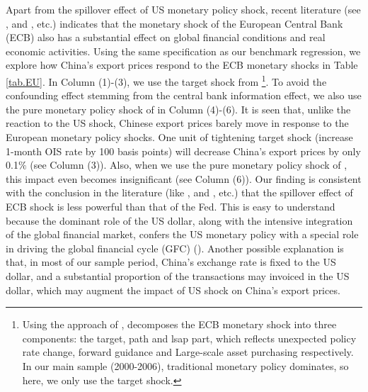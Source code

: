 Apart from the spillover effect of US monetary policy shock, recent literature (see \cite{ca2020monetary}, \cite{corsetti2021exchange} and \cite{miranda2022tale}, etc.) indicates that the monetary shock of the European Central Bank (ECB) also has a substantial effect on global financial conditions and real economic activities. Using the same specification as our benchmark regression, we explore how China's export prices respond to the ECB monetary shocks in Table \ref{tab.EU}. In Column (1)-(3), we use the target shock from \cite{miranda2022tale} \footnote{Using the approach of \cite{swanson2021measuring}, \cite{miranda2022tale} decomposes the ECB monetary shock into three components: the target, path and lsap part, which reflects unexpected policy rate change, forward guidance and Large-scale asset purchasing respectively. In our main sample (2000-2006), traditional monetary policy dominates, so here, we only use the target shock.}. To avoid the confounding effect stemming from the central bank information effect, we also use the pure monetary policy shock of \cite{jarocinski2020deconstructing} in Column (4)-(6). It is seen that, unlike the reaction to the US shock, Chinese export prices barely move in response to the European monetary policy shocks. One unit of tightening target shock (increase 1-month OIS rate by 100 basis points) will decrease China's export prices by only 0.1$\%$ (see Column (3)). Also, when we use the pure monetary policy shock of \cite{jarocinski2020deconstructing}, this impact even becomes insignificant (see Column (6)). Our finding is consistent with the conclusion in the literature (like \cite{ca2020monetary}, \cite{corsetti2021exchange} and \cite{miranda2022tale}, etc.) that the spillover effect of ECB shock is less powerful than that of the Fed. This is easy to understand because the dominant role of the US dollar, along with the intensive integration of the global financial market, confers the US monetary policy with a special role in driving the global financial cycle (GFC) (\cite{miranda2020us}). Another possible explanation is that, in most of our sample period, China's exchange rate is fixed to the US dollar, and a substantial proportion of the transactions may invoiced in the US dollar, which may augment the impact of US shock on China's export prices. 

